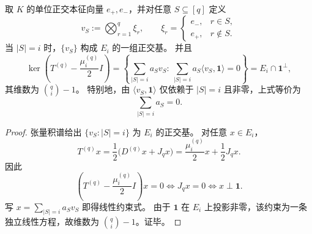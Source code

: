 \begin{proposition}[体谱特征空间的零和超平面方程]\label{prop:xi-replica-softcore-bulk-eigenspace-zero-sum-hyperplane}
取 \(K\) 的单位正交本征向量 \(e_+,e_-\)，并对任意 \(S\subseteq[q]\) 定义
\[
v_S:=\bigotimes_{r=1}^{q}\xi_r,\qquad
\xi_r=
\begin{cases}
e_-,&r\in S,\\
e_+,&r\notin S.
\end{cases}
\]
当 \(|S|=i\) 时，\(\{v_S\}\) 构成 \(E_i\) 的一组正交基。
并且
\[
\ker\!\left(T^{(q)}-\frac{\mu_i^{(q)}}2I\right)
=
\left\{
\sum_{|S|=i}a_Sv_S:\ 
\sum_{|S|=i}a_S\langle v_S,\mathbf1\rangle=0
\right\}
=E_i\cap\mathbf1^\perp,
\]
其维数为 \(\binom qi-1\)。
特别地，由 \(\langle v_S,\mathbf1\rangle\) 仅依赖于 \(|S|=i\) 且非零，上式等价为
\[
\sum_{|S|=i}a_S=0.
\]
\end{proposition}
\begin{proof}
张量积谱给出 \(\{v_S:|S|=i\}\) 为 \(E_i\) 的正交基。
对任意 \(x\in E_i\)，
\[
T^{(q)}x=\frac12\bigl(D^{(q)}x+J_qx\bigr)=\frac{\mu_i^{(q)}}2x+\frac12J_qx.
\]
因此
\[
\left(T^{(q)}-\frac{\mu_i^{(q)}}2I\right)x=0
\iff J_qx=0
\iff x\perp\mathbf1.
\]
写 \(x=\sum_{|S|=i}a_Sv_S\) 即得线性约束式。
由于 \(\mathbf1\) 在 \(E_i\) 上投影非零，该约束为一条独立线性方程，故维数为 \(\binom qi-1\)。证毕。
\end{proof}

\endinput
